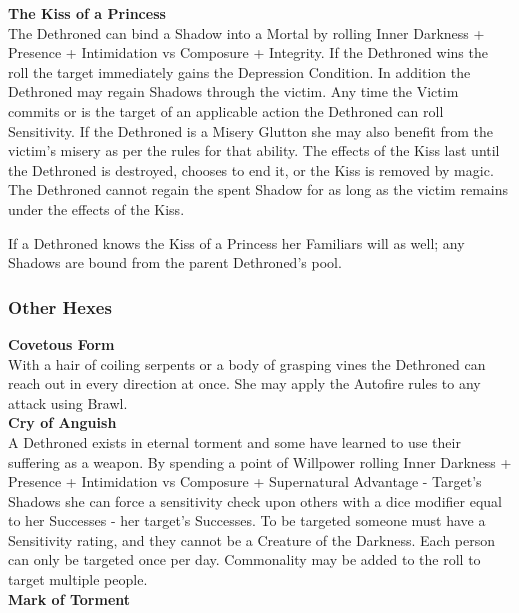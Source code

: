 \noindent \textbf{The Kiss of a Princess}\\

\noindent The Dethroned can bind a Shadow into a Mortal by rolling Inner Darkness + Presence + Intimidation vs Composure + Integrity. If the Dethroned wins the roll the target immediately gains the Depression Condition. In addition the Dethroned may regain Shadows through the victim. Any time the Victim commits or is the target of an applicable action the Dethroned can roll Sensitivity. If the Dethroned is a Misery Glutton she may also benefit from the victim's misery as per the rules for that ability. The effects of the Kiss last until the Dethroned is destroyed, chooses to end it, or the Kiss is removed by magic. The Dethroned cannot regain the spent Shadow for as long as the victim remains under the effects of the Kiss.

If a Dethroned knows the Kiss of a Princess her Familiars will as well; any Shadows are bound from the parent Dethroned's pool.\\

\subsubsection*{Other Hexes}

\noindent \textbf{Covetous Form}\\

\noindent With a hair of coiling serpents or a body of grasping vines the Dethroned can reach out in every direction at once. She may apply the Autofire rules to any attack using Brawl.\\

\noindent \textbf{Cry of Anguish}\\

\noindent A Dethroned exists in eternal torment and some have learned to use their suffering as a weapon. By spending a point of Willpower rolling Inner Darkness + Presence + Intimidation vs Composure + Supernatural Advantage - Target's Shadows she can force a sensitivity check upon others with a dice modifier equal to her Successes - her target's Successes. To be targeted someone must have a Sensitivity rating, and they cannot be a Creature of the Darkness. Each person can only be targeted once per day. Commonality may be added to the roll to target multiple people.\\

\noindent \textbf{Mark of Torment}\\

